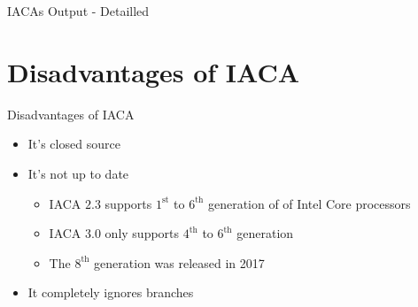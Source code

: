 \documentclass[10pt, tikz,border=2mm, xcolor=dvipsnames]{beamer}
\begin{document}
\begin{frame}[fragile]{IACAs Output - Detailled}
\hspace*{-0.6cm}
\end{frame}



\section{Disadvantages of IACA}

\begin{frame}[fragile]{Disadvantages of IACA}
\begin{itemize}[<+- | alert@+>]
    \item It's closed source
    \item It's not up to date
    \begin{itemize}[<+- | alert@+>]
        \item IACA $2.3$ supports $1^{\text{st}}$ to $6^{\text{th}}$ generation of of Intel Core processors
        \item IACA $3.0$ only supports $4^{\text{th}}$ to $6^{\text{th}}$ generation
        \item The $8^{\text{th}}$ generation was released in 2017
    \end{itemize}
    \item It completely ignores branches
\end{itemize}
\end{frame}
\end{document}
